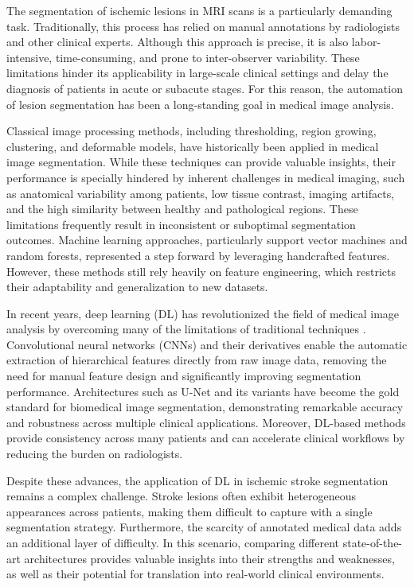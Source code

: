 \documentclass[12pt]{article}
\begin{document}
The segmentation of ischemic lesions in MRI scans is a particularly demanding task. Traditionally, this process has relied on manual annotations by radiologists and other clinical experts. Although this approach is precise, it is also labor-intensive, time-consuming, and prone to inter-observer variability. These limitations hinder its applicability in large-scale clinical settings and delay the diagnosis of patients in acute or subacute stages. For this reason, the automation of lesion segmentation has been a long-standing goal in medical image analysis.

Classical image processing methods, including thresholding, region growing, clustering, and deformable models, have historically been applied in medical image segmentation. While these techniques can provide valuable insights, their performance is specially hindered by inherent challenges in medical imaging, such as anatomical variability among patients, low tissue contrast, imaging artifacts, and the high similarity between healthy and pathological regions. These limitations frequently result in inconsistent or suboptimal segmentation outcomes. Machine learning approaches, particularly support vector machines and random forests, represented a step forward by leveraging handcrafted features. However, these methods still rely heavily on feature engineering, which restricts their adaptability and generalization to new datasets.

In recent years, deep learning (DL) has revolutionized the field of medical image analysis by overcoming many of the limitations of traditional techniques \cite{Liu2021}. Convolutional neural networks (CNNs) and their derivatives enable the automatic extraction of hierarchical features directly from raw image data, removing the need for manual feature design and significantly improving segmentation performance. Architectures such as U-Net and its variants have become the gold standard for biomedical image segmentation, demonstrating remarkable accuracy and robustness across multiple clinical applications. Moreover, DL-based methods provide consistency across many patients and can accelerate clinical workflows by reducing the burden on radiologists.

Despite these advances, the application of DL in ischemic stroke segmentation remains a complex challenge. Stroke lesions often exhibit heterogeneous appearances across patients, making them difficult to capture with a single segmentation strategy. Furthermore, the scarcity of annotated medical data adds an additional layer of difficulty. In this scenario, comparing different state-of-the-art architectures provides valuable insights into their strengths and weaknesses, as well as their potential for translation into real-world clinical environments.
\end{document}
